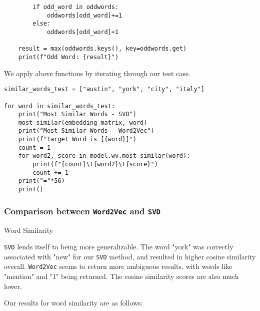 \documentclass[12pt, letterpaper]{article}
\begin{document}
\begin{mdframed}[backgroundcolor=shadecolor]
\begin{verbatim}
        if odd_word in oddwords:
            oddwords[odd_word]+=1
        else:
            oddwords[odd_word]=1
    
    result = max(oddwords.keys(), key=oddwords.get)
    print(f"Odd Word: {result}")

\end{verbatim}
\end{mdframed}

We apply above functions by iterating through our test case.

\begin{mdframed}[backgroundcolor=shadecolor]
\begin{verbatim}
similar_words_test = ["austin", "york", "city", "italy"]

for word in similar_words_test:
    print("Most Similar Words - SVD")
    most_similar(embedding_matrix, word)
    print("Most Similar Words - Word2Vec")
    print(f"Target Word is [{word}]")
    count = 1
    for word2, score in model.wv.most_similar(word):
        print(f"{count}\t{word2}\t{score}")
        count += 1
    print("="*56)
    print()
\end{verbatim}
\end{mdframed}

\subsubsection{Comparison between \texttt{Word2Vec} and \texttt{SVD}}

{\large Word Similarity}

\texttt{SVD} lends itself to being more generalizable. The word "york" was correctly associated with "new" for our \texttt{SVD} method, and resulted in higher cosine similarity overall. 
\texttt{Word2Vec} seems to return more ambiguous results, with words like "mention" and "1" being returned. The cosine similarity scores are also much lower.

Our results for word similarity are as follows:
\end{document}
